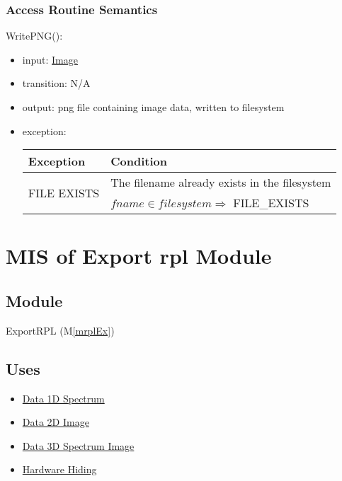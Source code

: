 \documentclass[12pt, titlepage]{article}
\newcommand{\mref}[1]{M\ref{#1}}
\begin{document}
\subsubsection{Access Routine Semantics}

\noindent WritePNG():
\begin{itemize}
    \item input: \hyperref[Mod:Image]{Image}
    \item transition: N/A
    \item output: png file containing image data, written to filesystem
    \item exception:
    \begin{center}
        \begin{tabular}{p{3cm} p{12cm}}
            \toprule[0.15em]
            \textbf{Exception} & \textbf{Condition}\\
            \midrule[0.1em]
            \multirow{2}{0.25\textwidth}{FILE EXISTS} & The filename already
            exists in the filesystem\\ 
            & $fname \in filesystem \Rightarrow$ FILE\_EXISTS\\ 
            \bottomrule[0.15em]
        \end{tabular}
    \end{center}
\end{itemize}

\newpage
\section{MIS of Export rpl Module} \label{Mod:ExportRPL}

\subsection{Module}

ExportRPL (\mref{mrplEx})

\subsection{Uses}
\begin{itemize}
    \item \hyperref[Mod:Spectrum]{Data 1D Spectrum}
    \item \hyperref[Mod:Image]{Data 2D Image}
    \item \hyperref[Mod:SI]{Data 3D Spectrum Image}
    \item \hyperref[Mod:HH]{Hardware Hiding}
\end{itemize}
\end{document}

